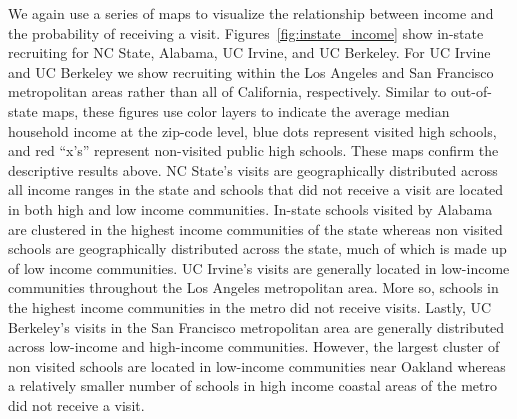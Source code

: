 \documentclass[twoside]{article}
\begin{document}


We again use a series of maps to visualize the relationship between income and the probability of receiving a visit. Figures~\ref{fig:instate_income} show in-state recruiting for NC State, Alabama, UC Irvine, and UC Berkeley. For UC Irvine and UC Berkeley we show recruiting within the Los Angeles and San Francisco metropolitan areas rather than all of California, respectively. Similar to out-of-state maps, these figures use color layers to indicate the average median household income at the zip-code level, blue dots represent visited high schools, and red ``x's'' represent non-visited public high schools. These maps confirm the descriptive results above. NC State's visits are geographically distributed across all income ranges in the state and schools that did not receive a visit are located in both high and low income communities. In-state schools visited by Alabama are clustered in the highest income communities of the state whereas non visited schools are geographically distributed across the state, much of which is made up of low income communities. UC Irvine's visits are generally located in low-income communities throughout the Los Angeles metropolitan area. More so, schools in the highest income communities in the metro did not receive visits. Lastly, UC Berkeley's visits in the San Francisco metropolitan area are generally distributed across low-income and high-income communities. However, the largest cluster of non visited schools are located in low-income communities near Oakland whereas a relatively smaller number of schools in high income coastal areas of the metro did not receive a visit.
\end{document}
